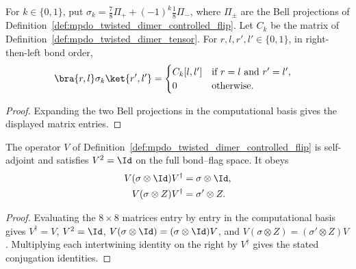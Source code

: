 \begin{lemma}%
    \label{lem:mpdo_twisted_dimer_bond_state_entries}
    \leanok
    For $k\in\{0,1\}$, put $\sigma_k=\frac78\Pi_++(-1)^k\frac18\Pi_-$,
    where $\Pi_\pm$ are the Bell projections of
    Definition~\ref{def:mpdo_twisted_dimer_controlled_flip}.
    Let $C_k$ be the matrix of Definition~\ref{def:mpdo_twisted_dimer_tensor}.
    For $r,l,r',l'\in\{0,1\}$, in right-then-left bond order,
    \begin{align}
        \bra{r,l}\sigma_k\ket{r',l'} & =
        \begin{cases}
            C_k[l,l'] & \text{if } r=l \text{ and } r'=l', \\
            0         & \text{otherwise}.
        \end{cases}
        \notag
    \end{align}
\end{lemma}
\begin{proof}\leanok
    Expanding the two Bell projections in the computational basis gives the
    displayed matrix entries.
\end{proof}

\begin{lemma}%
    \label{lem:mpdo_twisted_dimer_controlled_flip}
    \leanok
    The operator $V$ of Definition~\ref{def:mpdo_twisted_dimer_controlled_flip}
    is self-adjoint and satisfies $V^2=\Id$ on the full bond--flag space.
    It obeys
    \begin{align}
        V(\sigma\otimes\Id)V^\dagger & =\sigma\otimes\Id,
        \notag                                            \\
        V(\sigma\otimes Z)V^\dagger  & =\sigma'\otimes Z.
        \notag
    \end{align}
\end{lemma}
\begin{proof}\leanok
    Evaluating the $8\times8$ matrices entry by entry in the computational
    basis gives $V^\dagger=V$, $V^2=\Id$,
    $V(\sigma\otimes\Id)=(\sigma\otimes\Id)V$, and
    $V(\sigma\otimes Z)=(\sigma'\otimes Z)V$.
    Multiplying each intertwining identity on the right by $V^\dagger$
    gives the stated conjugation identities.
\end{proof}

